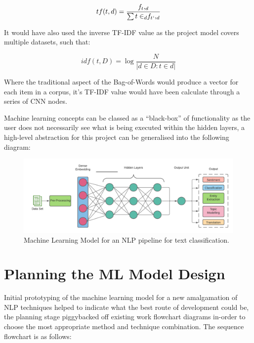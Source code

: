 \begin{equation}
    tf(t,d) = \frac{f_t, _d}{\sum{t \in_d} f _t {_`}, _d}
\end{equation}

It would have also used the inverse TF-IDF value as the project model covers multiple datasets, such that:

\begin{equation}
    idf(t, D) = \log \frac{N}{|d \in D : t \in d|}
\end{equation}

Where the traditional aspect of the Bag-of-Words would produce a vector for each item in a corpus, it’s TF-IDF value would have been calculate through a series of CNN nodes.

Machine learning concepts can be classed as a “black-box” of functionality as the user does not necessarily see what is being executed within the hidden layers, a high-level abstraction for this project can be generalised into the following diagram:

\begin{figure}[H]
    \centering
    \includegraphics[width=\textwidth]{figures/chapter-5/MLNLP.pdf}
    \caption[MachineLearningNLP]{Machine Learning Model for an NLP pipeline for text classification.
    \label{fig:MLNLP}}
\end{figure}

\section{Planning the ML Model Design}

Initial prototyping of the machine learning model for a new amalgamation of NLP techniques helped to indicate what the best route of development could be, the planning stage piggybacked off existing work flowchart diagrams in-order to choose the most appropriate method and technique combination. The sequence flowchart is as follows:

